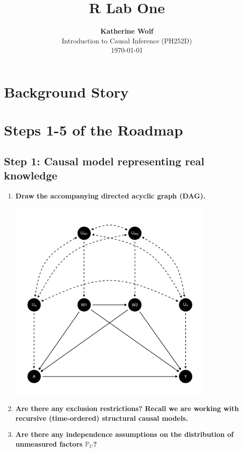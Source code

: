 \documentclass{article}\usepackage[]{graphicx}\usepackage[]{xcolor}
\title{\textbf{R Lab One}}
\author{\textbf{Katherine Wolf}\\ Introduction to Causal Inference (PH252D)\\ \today}
\date{}
\newenvironment{knitrout}{}{} %
\begin{document}
\maketitle

\section{Background Story}

\section{Steps 1-5 of the Roadmap}

  \subsection{Step 1: Causal model representing real knowledge}
  
  \begin{enumerate}[label=\textbf{\alph*.}]

    \item \textbf{Draw the accompanying directed acyclic graph (DAG).}
    
\begin{knitrout}
\color{fgcolor}
\includegraphics[width=4in]{figure/unnamed-chunk-2-1} 

\end{knitrout}
    

    \item \textbf{Are there any exclusion restrictions? Recall we are working with recursive (time-ordered) structural causal models.}
    
    \item \textbf{Are there any independence assumptions on the distribution of unmeasured factors $\mathbb{P}_U$?}

  \end{enumerate}
  
\end{document}
